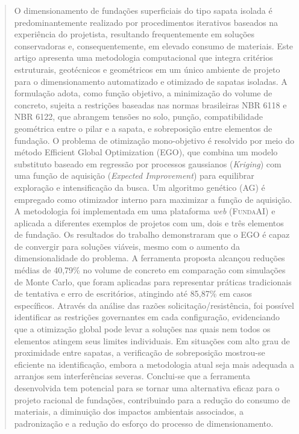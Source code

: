 \documentclass[preprint,11pt]{elsarticle}
\theoremstyle{plain}
\theoremstyle{definition}
\theoremstyle{remark}
\begin{document}
\begin{frontmatter}
\begin{abstract}
O dimensionamento de fundações superficiais do tipo sapata isolada é predominantemente realizado por procedimentos iterativos baseados na experiência do projetista, resultando frequentemente em soluções conservadoras e, consequentemente, em elevado consumo de materiais. Este artigo apresenta uma metodologia computacional que integra critérios estruturais, geotécnicos e geométricos em um único ambiente de projeto para o dimensionamento automatizado e otimizado de sapatas isoladas. A formulação adota, como função objetivo, a minimização do volume de concreto, sujeita a restrições baseadas nas normas brasileiras NBR 6118 e NBR 6122, que abrangem tensões no solo, punção, compatibilidade geométrica entre o pilar e a sapata, e sobreposição entre elementos de fundação. O problema de otimização mono-objetivo é resolvido por meio do método Efficient Global Optimization (EGO), que combina um modelo substituto baseado em regressão por processos gaussianos (\textit{Kriging}) com uma função de aquisição (\textit{Expected Improvement}) para equilibrar exploração e intensificação da busca. Um algoritmo genético (AG) é empregado como otimizador interno para maximizar a função de aquisição. A metodologia foi implementada em uma plataforma \textit{web} (\textsc{FundaAI}) e aplicada a diferentes exemplos de projetos com um, dois e três elementos de fundação. Os resultados do trabalho demonstraram que o EGO é capaz de convergir para soluções viáveis, mesmo com o aumento da dimensionalidade do problema. A ferramenta proposta alcançou reduções médias de 40,79\% no volume de concreto em comparação com simulações de Monte Carlo, que foram aplicadas para representar práticas tradicionais de tentativa e erro de escritórios, atingindo até 85,87\% em casos específicos. Através da análise das razões solicitação/resistência, foi possível identificar as restrições governantes em cada configuração, evidenciando que a otimização global pode levar a soluções nas quais nem todos os elementos atingem seus limites individuais. Em situações com alto grau de proximidade entre sapatas, a verificação de sobreposição mostrou-se eficiente na identificação, embora a metodologia atual seja mais adequada a arranjos sem interferências severas. Conclui-se que a ferramenta desenvolvida tem potencial para se tornar uma alternativa eficaz para o projeto racional de fundações, contribuindo para a redução do consumo de materiais, a diminuição dos impactos ambientais associados, a padronização e a redução do esforço do processo de dimensionamento.



\end{abstract}
\end{frontmatter}
\end{document}
